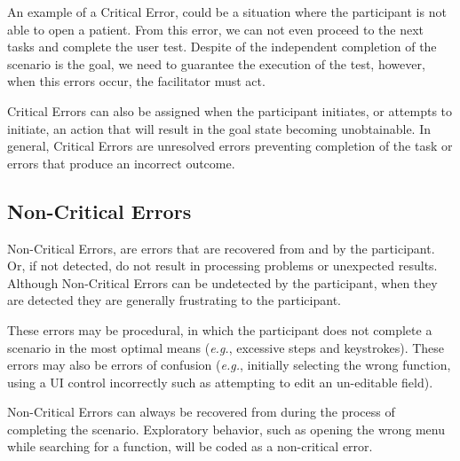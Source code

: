 An example of a Critical Error, could be a situation where the participant is not able to open a patient. From this error, we can not even proceed to the next tasks and complete the user test. Despite of the independent completion of the scenario is the goal, we need to guarantee the execution of the test, however, when this errors occur, the facilitator must act.

Critical Errors can also be assigned when the participant initiates, or attempts to initiate, an action that will result in the goal state becoming unobtainable. In general, Critical Errors are unresolved errors preventing completion of the task or errors that produce an incorrect outcome.

\subsection{Non-Critical Errors}

Non-Critical Errors, are errors that are recovered from and by the participant. Or, if not detected, do not result in processing problems or unexpected results. Although Non-Critical Errors can be undetected by the participant, when they are detected they are generally frustrating to the participant.

These errors may be procedural, in which the participant does not complete a scenario in the most optimal means ({\it e.g.}, excessive steps and keystrokes). These errors may also be errors of confusion ({\it e.g.}, initially selecting the wrong function, using a UI control incorrectly such as attempting to edit an un-editable field).

Non-Critical Errors can always be recovered from during the process of completing the scenario. Exploratory behavior, such as opening the wrong menu while searching for a function, will be coded as a non-critical error.